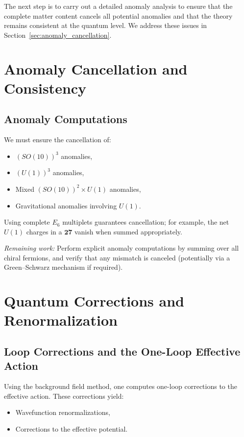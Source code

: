 \documentclass[aps,prd,preprint,groupedaddress]{revtex4-2}
\begin{document}
The next step is to carry out a detailed anomaly analysis to ensure that the complete matter content cancels all potential anomalies and that the theory remains consistent at the quantum level. We address these issues in Section~\ref{sec:anomaly_cancellation}.

\section{Anomaly Cancellation and Consistency}

\subsection{Anomaly Computations}
We must ensure the cancellation of:
\begin{itemize}
  \item $(SO(10))^3$ anomalies,
  \item $(U(1))^3$ anomalies,
  \item Mixed $(SO(10))^2 \times U(1)$ anomalies,
  \item Gravitational anomalies involving $U(1)$.
\end{itemize}
Using complete $E_6$ multiplets guarantees cancellation; for example, the net $U(1)$ charges in a $\mathbf{27}$ vanish when summed appropriately.

\emph{Remaining work:} Perform explicit anomaly computations by summing over all chiral fermions, and verify that any mismatch is canceled (potentially via a Green--Schwarz mechanism if required).

\section{Quantum Corrections and Renormalization}

\subsection{Loop Corrections and the One-Loop Effective Action}
Using the background field method, one computes one-loop corrections to the effective action. These corrections yield:
\begin{itemize}
  \item Wavefunction renormalizations,
  \item Corrections to the effective potential.
\end{itemize}
\end{document}
